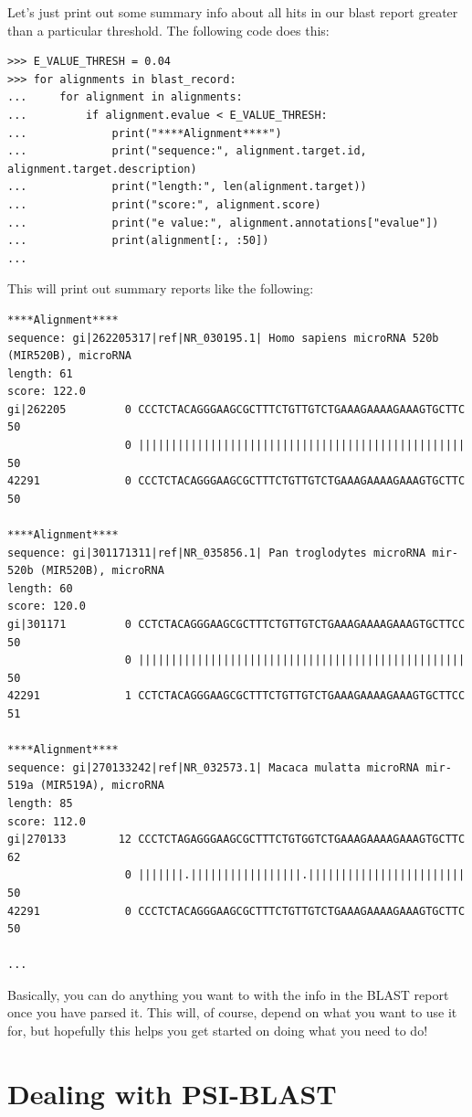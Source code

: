 Let's just print out some summary info about all hits in our blast report
greater than a particular threshold. The following code does this:

\begin{verbatim}
>>> E_VALUE_THRESH = 0.04
>>> for alignments in blast_record:
...     for alignment in alignments:
...         if alignment.evalue < E_VALUE_THRESH:
...             print("****Alignment****")
...             print("sequence:", alignment.target.id, alignment.target.description)
...             print("length:", len(alignment.target))
...             print("score:", alignment.score)
...             print("e value:", alignment.annotations["evalue"])
...             print(alignment[:, :50])
...
\end{verbatim}

This will print out summary reports like the following:

\begin{verbatim}
****Alignment****
sequence: gi|262205317|ref|NR_030195.1| Homo sapiens microRNA 520b (MIR520B), microRNA
length: 61
score: 122.0
gi|262205         0 CCCTCTACAGGGAAGCGCTTTCTGTTGTCTGAAAGAAAAGAAAGTGCTTC 50
                  0 |||||||||||||||||||||||||||||||||||||||||||||||||| 50
42291             0 CCCTCTACAGGGAAGCGCTTTCTGTTGTCTGAAAGAAAAGAAAGTGCTTC 50

****Alignment****
sequence: gi|301171311|ref|NR_035856.1| Pan troglodytes microRNA mir-520b (MIR520B), microRNA
length: 60
score: 120.0
gi|301171         0 CCTCTACAGGGAAGCGCTTTCTGTTGTCTGAAAGAAAAGAAAGTGCTTCC 50
                  0 |||||||||||||||||||||||||||||||||||||||||||||||||| 50
42291             1 CCTCTACAGGGAAGCGCTTTCTGTTGTCTGAAAGAAAAGAAAGTGCTTCC 51

****Alignment****
sequence: gi|270133242|ref|NR_032573.1| Macaca mulatta microRNA mir-519a (MIR519A), microRNA
length: 85
score: 112.0
gi|270133        12 CCCTCTAGAGGGAAGCGCTTTCTGTGGTCTGAAAGAAAAGAAAGTGCTTC 62
                  0 |||||||.|||||||||||||||||.|||||||||||||||||||||||| 50
42291             0 CCCTCTACAGGGAAGCGCTTTCTGTTGTCTGAAAGAAAAGAAAGTGCTTC 50

...
\end{verbatim}

Basically, you can do anything you want to with the info in the BLAST
report once you have parsed it. This will, of course, depend on what
you want to use it for, but hopefully this helps you get started on
doing what you need to do!

\section{Dealing with PSI-BLAST}


